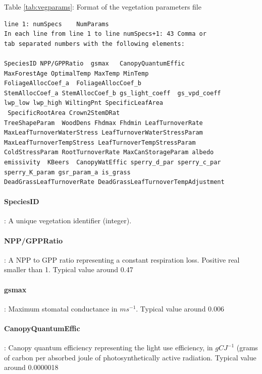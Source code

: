 \begin{center}
Table \ref{tab:vegparams}: Format of the vegetation parameters file
\begin{Frame}\label{tab:vegparams}
\begin{verbatim}
line 1: numSpecs	NumParams												
In each line from line 1 to line numSpecs+1: 43 Comma or
tab separated numbers with the following elements:

SpeciesID NPP/GPPRatio	gsmax	CanopyQuantumEffic
MaxForestAge OptimalTemp MaxTemp MinTemp 
FoliageAllocCoef_a	FoliageAllocCoef_b 
StemAllocCoef_a	StemAllocCoef_b	gs_light_coeff	gs_vpd_coeff
lwp_low lwp_high WiltingPnt	SpecificLeafArea
 SpecificRootArea Crown2StemDRat 
TreeShapeParam	WoodDens Fhdmax	Fhdmin LeafTurnoverRate
MaxLeafTurnoverWaterStress LeafTurnoverWaterStressParam
MaxLeafTurnoverTempStress LeafTurnoverTempStressParam
ColdStressParam	RootTurnoverRate MaxCanStorageParam albedo
emissivity	KBeers	CanopyWatEffic sperry_d_par sperry_c_par 
sperry_K_param gsr_param_a is_grass 
DeadGrassLeafTurnoverRate DeadGrassLeafTurnoverTempAdjustment 

\end{verbatim}
\end{Frame}
\end{center} 

\hangindent=0.7cm
\paragraph{SpeciesID}: A unique vegetation identifier (integer).

\hangindent=0.7cm
\paragraph{NPP/GPPRatio}: A NPP to GPP ratio representing a constant respiration loss. Positive real smaller than 1. Typical value around 0.47

\hangindent=0.7cm
\paragraph{gsmax}: Maximum stomatal conductance in $ms^{-1}$. Typical value around 0.006

\hangindent=0.7cm
\paragraph{CanopyQuantumEffic}: Canopy quantum efficiency representing the light use efficiency, in $gCJ^{-1}$ (grams of carbon per absorbed joule of photosynthetically active radiation. Typical value around 0.0000018

